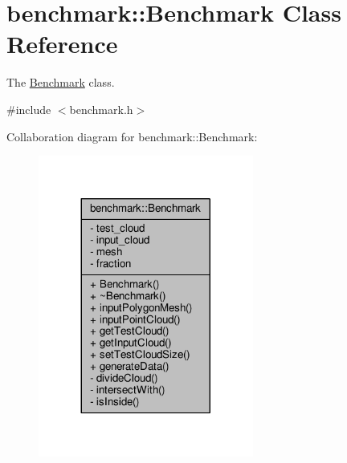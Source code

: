 \hypertarget{classbenchmark_1_1_benchmark}{}\section{benchmark\+:\+:Benchmark Class Reference}
\label{classbenchmark_1_1_benchmark}


The \hyperlink{classbenchmark_1_1_benchmark}{Benchmark} class.  




{\ttfamily \#include $<$benchmark.\+h$>$}



Collaboration diagram for benchmark\+:\+:Benchmark\+:\nopagebreak
\begin{figure}[H]
\begin{center}
\leavevmode
\includegraphics[width=200pt]{classbenchmark_1_1_benchmark__coll__graph}
\end{center}
\end{figure}
